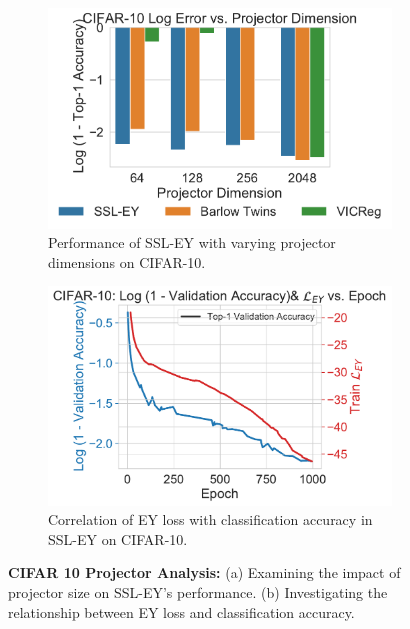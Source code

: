 \begin{figure}[H]
    \begin{subfigure}[b]{0.47\textwidth}
        \centering
        \includegraphics[width=\textwidth]{figures/SSL/cifar10_proj_dim_log_error}
        \caption{Performance of SSL-EY with varying projector dimensions on CIFAR-10.}
        \label{fig:ssl_projector_dimensions_10}
    \end{subfigure}
    \hfill
    \begin{subfigure}[b]{0.47\textwidth}
        \centering
        \includegraphics[width=\textwidth]{figures/SSL/cifar10_corr_vs_acc_log_error}
        \caption{Correlation of EY loss with classification accuracy in SSL-EY on CIFAR-10.}
        \label{fig:ssl_learning_curve_cifar10_vs_corr}
    \end{subfigure}
    \caption{\textbf{CIFAR 10 Projector Analysis:} (a) Examining the impact of projector size on SSL-EY's performance. (b) Investigating the relationship between EY loss and classification accuracy.}
    \label{fig:ssl_projector_cifar_10}
\end{figure}



